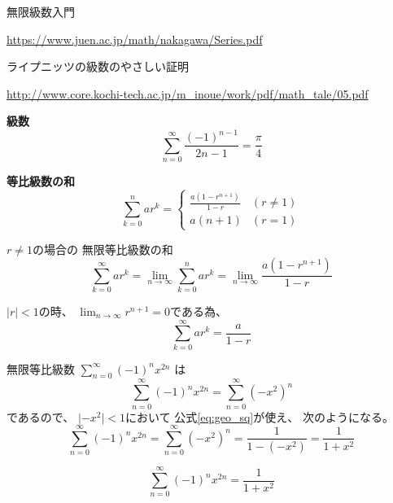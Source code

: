\documentclass[12pt,b5paper]{ltjsarticle}
\begin{document}
\hrulefill

無限級数入門

\url{https://www.juen.ac.jp/math/nakagawa/Series.pdf}

\dotfill

ライプニッツの級数のやさしい証明

\url{http://www.core.kochi-tech.ac.jp/m_inoue/work/pdf/math_tale/05.pdf}

\hrulefill


\textbf{級数}
\begin{equation}
 \sum_{n=0}^{\infty} \frac{(-1)^{n-1}}{2n-1} = \frac{\pi}{4}
\end{equation}

\dotfill

\textbf{等比級数の和}
\begin{equation}
 \sum_{k=0}^{n}ar^{k} =
  \begin{cases}
   \frac{a(1-r^{n+1})}{1-r} & (r\ne 1)\\
   a(n+1) & (r=1)
  \end{cases}
\end{equation}

$r\ne 1$の場合の
無限等比級数の和
\begin{equation}
 \sum_{k=0}^{\infty}ar^{k}
  = \lim_{n\to \infty}\sum_{k=0}^{n}ar^{k}
  = \lim_{n\to \infty}
   \frac{a(1-r^{n+1})}{1-r}
\end{equation}

$\lvert r \rvert <1$の時、
$\lim_{n\to\infty}r^{n+1} = 0$である為、
\begin{equation}\label{eq:geo_sq}
 \sum_{k=0}^{\infty}ar^{k}
  = \frac{a}{1-r}
\end{equation}

\hrulefill

無限等比級数
$\displaystyle \sum_{n=0}^{\infty} (-1)^{n}x^{2n}$
は
\begin{equation}
 \sum_{n=0}^{\infty} (-1)^{n}x^{2n} = \sum_{n=0}^{\infty} \left(-x^{2}\right)^{n}
\end{equation}
 であるので、
 $\lvert -x^{2} \rvert <1$において
 公式\eqref{eq:geo_sq}が使え、
 次のようになる。
 \begin{equation}
  \sum_{n=0}^{\infty} (-1)^{n}x^{2n} = \sum_{n=0}^{\infty} (-x^{2})^{n}
   = \frac{1}{1-(-x^{2})}
   = \frac{1}{1+x^{2}}
 \end{equation}

 \dotfill

 
 \begin{equation}\label{eq:lim_leib}
  \sum_{n=0}^{\infty} (-1)^{n}x^{2n} = \frac{1}{1+x^{2}}
 \end{equation}
\end{document}
